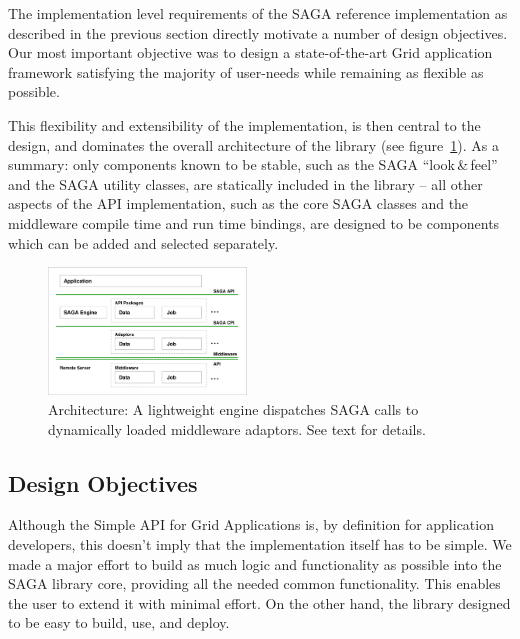 
The implementation level requirements of the SAGA reference
implementation as described in the previous section directly
motivate a number of design objectives. Our most important objective was to 
design a state-of-the-art Grid application framework satisfying the majority 
of user-needs while remaining as flexible as possible. 

This flexibility and extensibility of the implementation, 
 is then central to the design, and  dominates
the overall architecture of the library (see figure~\ref{fig:archi}).  As
a summary: only components known to be stable, such as the SAGA
``look\,\&\,feel'' and the SAGA utility classes, are statically included
in the library -- all other aspects of the API implementation, such as
the core SAGA classes and the middleware compile time and run time
bindings, are designed to be components which can be added and
selected separately.

\begin{figure}[!ht]
 \begin{center}
  \includegraphics[width=0.47\textwidth]{images/saga_architecture}
  \up
  \caption{\label{fig:archi}
    Architecture: A lightweight engine dispatches SAGA 
    calls to dynamically loaded middleware adaptors.  See text for
    details.}
 \end{center}
\end{figure}

\up
\subsection{Design Objectives}

  Although the Simple API for Grid Applications is, by definition
   for application developers,  this doesn't imply that the
  implementation itself has to be simple. We made a major effort to
  build	as much logic and functionality as possible into the SAGA
  library core, providing all the needed common functionality. This	enables
  the user to extend it with minimal effort. On the other hand, the
  library  designed to be easy to build, use, and deploy. 
	
